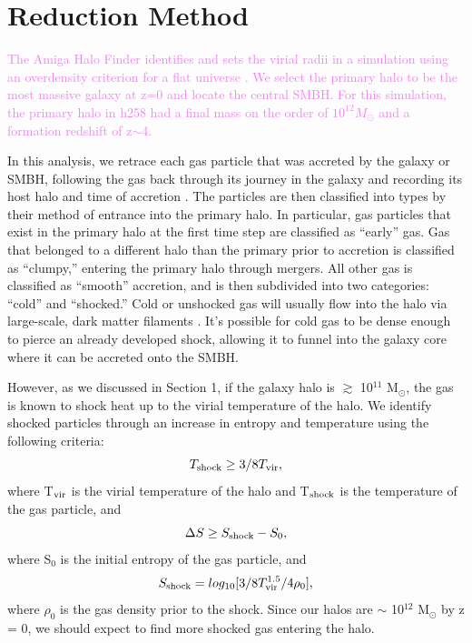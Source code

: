 \documentclass[manuscript]{aastex}
\begin{document}

\section{Reduction Method}\label{redux}

\textcolor{violet}{
The Amiga Halo Finder identifies and sets the virial radii in a simulation using an overdensity criterion for a flat universe \citep{Knebe2001,Knollmann2009,Gill2004}. We select the primary halo to be the most massive galaxy at z=0 and locate the central SMBH. For this simulation, the primary halo in h258 had a final mass on the order of $10^{12} M_{\odot}$ and a formation redshift of z$\sim$4.  
}

In this analysis, we retrace each gas particle that was accreted by the galaxy or SMBH, following the gas back through its journey in the galaxy and recording its host halo and time of accretion \citep{Brooks2009}. The particles are then classified into types by their method of entrance into the primary halo. In particular, gas particles that exist in the primary halo at the first time step are classified as ``early'' gas. Gas that belonged to a different halo than the primary prior to accretion is classified as ``clumpy,'' entering the primary halo through mergers. All other gas is classified as ``smooth'' accretion, and is then subdivided into two categories: ``cold'' and ``shocked.'' Cold or unshocked gas will usually flow into the halo via large-scale, dark matter filaments \citep{Bellovary2013}. It's possible for cold gas to be dense enough to pierce an already developed shock, allowing it to funnel into the galaxy core where it can be accreted onto the SMBH.

However, as we discussed in Section 1, if the galaxy halo is $\gtrsim$ 10$^{11}$ M$_{\odot} $, the gas is known to shock heat up to the virial temperature of the halo. We identify shocked particles through an increase in entropy and temperature using the following criteria:
\begin{equation}
T_{\rm shock} \geq 3/8 T_{\rm vir},
\end{equation}
where T$_{\rm vir}$ is the virial temperature of the halo and T$_{\rm shock}$ is the temperature of the gas particle, and 
\begin{equation}
\Delta S \geq S_{\rm shock} - S_0,
\end{equation}
where S$_0$ is the initial entropy of the gas particle, and 
\begin{equation}
S_{\rm shock} = log_{10}[3/8 T_{\rm vir}^{1.5}/4 \rho_0],
\end{equation}
where $\rho_0$ is the gas density prior to the shock. Since our halos are $\sim$ 10$^{12}$ M$_{\odot} $ by z = 0, we should expect to find more shocked gas entering the halo.
\end{document}
